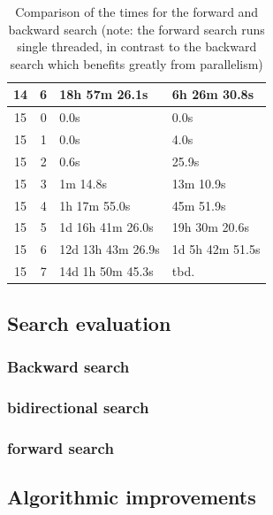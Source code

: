 \documentclass[10pt,journal,compsoc]{IEEEtran}
\begin{document}
\begin{table}[htbp]
\begin{tabular}{c|c|l|l}
    14         & 6          & 18h 57m 26.1s            & 6h 26m 30.8s              \\
    \hline
    15         & 0          & 0.0s                     & 0.0s                      \\
    15         & 1          & 0.0s                     & 4.0s                      \\
    15         & 2          & 0.6s                     & 25.9s                     \\
    15         & 3          & 1m 14.8s                 & 13m 10.9s                 \\
    15         & 4          & 1h 17m 55.0s             & 45m 51.9s                 \\
    15         & 5          & 1d 16h 41m 26.0s         & 19h 30m 20.6s             \\
    15         & 6          & 12d 13h 43m 26.9s        & 1d 5h 42m 51.5s           \\
    15         & 7          & 14d 1h 50m 45.3s         & tbd.                      \\  %
  \end{tabular}
  \centering
  \label{tab:search_algorithms}
  \caption{Comparison of the times for the forward and backward search (note: the forward search runs single threaded, in contrast to the backward search which benefits greatly from parallelism)}
\end{table}


\subsection{Search evaluation}
\subsubsection{Backward search}
\subsubsection{bidirectional search}
\subsubsection{forward search}

\subsection{Algorithmic improvements}
\end{document}
